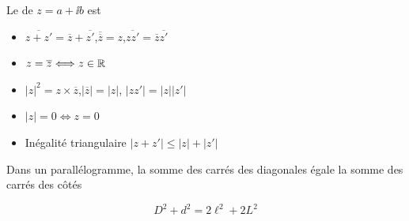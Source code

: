 \begin{frame}
   Le  de $z = a + \ii b$ est \\[0.5em]





\pause
\pause
\pause
\pause

\vspace{-11em}

\begin{itemize}
  \item $\overline{z + z'} = \overline{z} + \overline{z'}$,\quad $\overline{\overline{z}} =
  z$,\quad $\overline{zz'} = \overline{z}  \overline{z'}$

  \item $z = \overline{z} \Longleftrightarrow z \in \mathbb{R}$

  \item $\left| z \right|^2 = z \times \overline{z}$,\quad $\left| \overline{z} \right| =
  \left| z \right|$, \quad $\left| zz' \right| = \left| z \right|  \left| z'
  \right|$

  \item $\left| z \right| = 0 \Longleftrightarrow z = 0$

  \item Inégalité triangulaire  $\left| z + z' \right| \leqslant \left| z
  \right| + \left| z' \right|$
\end{itemize}

\end{frame}

\begin{frame}


\begin{exemple}
  Dans un parallélogramme, la somme des carrés des diagonales égale la
  somme des carrés des c\^otés
\end{exemple}


\pause

\vspace{1em}

$$D^2+d^2 = 2\ell^2+2L^2$$
\end{frame}

